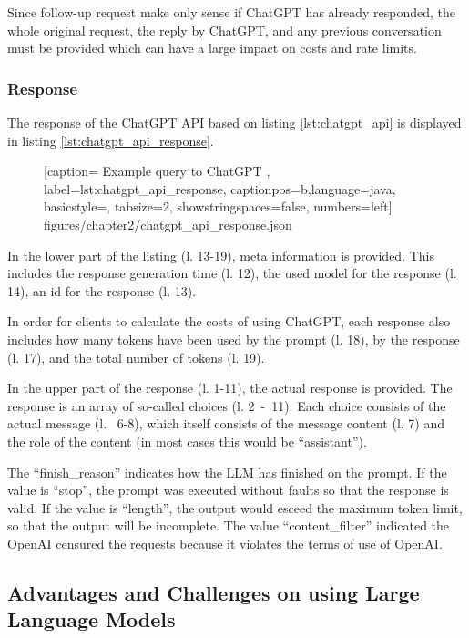 Since follow-up request make only sense if ChatGPT has already responded, the whole original request, the reply by ChatGPT, and any previous conversation must be provided which can have a large impact on costs and rate limits. 

\subsubsection{Response}

The response of the ChatGPT \ac{API} based on listing \ref{lst:chatgpt_api} is displayed in listing \ref{lst:chatgpt_api_response}.
 \begin{figure} [htbp!]
			
			[caption={ Example query to ChatGPT  \cite{ChatGPT_url}},
			label={lst:chatgpt_api_response},
			captionpos=b,language=java, basicstyle=\footnotesize, tabsize=2, showstringspaces=false,  numbers=left]
			{figures/chapter2/chatgpt_api_response.json}
		\end{figure}

In the lower part of the listing (l. 13-19), meta information is provided. This includes the response generation time (l. 12), the used model for the response (l. 14), an id for the response (l. 13).

In order for clients to calculate the costs of using ChatGPT, each response also includes how many tokens have been used by the prompt (l. 18), by the response (l. 17), and the total number of tokens (l. 19).

In the upper part of the response (l. 1-11), the actual response is provided. The response is an array of so-called choices (l. 2~-~11). Each choice consists of the actual message (l.~ 6-8), which itself consists of the message content (l. 7) and the role of  the content (in most cases this would be \enquote{assistant}).

The \enquote{finish\_reason} indicates how the \ac{LLM} has finished on the prompt. If the value is \enquote{stop}, the prompt was executed without faults so that the response is valid. If the value is \enquote{length}, the output would esceed the maximum token limit, so that the output will be incomplete. The value \enquote{content\_filter} indicated the OpenAI censured the requests because it violates the terms of use of OpenAI. \cite{ChatGPT_url}
\subsection{Advantages and Challenges on using Large Language Models}\label{sec:llm_challenges}

